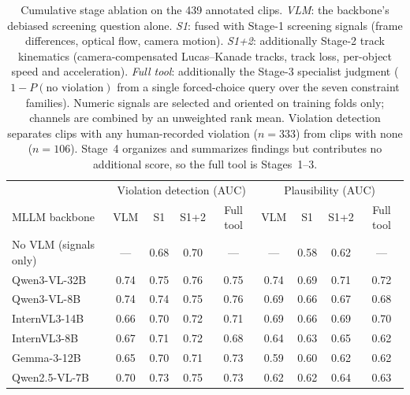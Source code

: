 \begin{table}[h]
    \centering
    \small
    \setlength{\tabcolsep}{5pt}
    \begin{tabular}{@{}lcccc|cccc@{}}
        \toprule
        & \multicolumn{4}{c|}{Violation detection (AUC)} & \multicolumn{4}{c}{Plausibility (AUC)} \\
        MLLM backbone & VLM & S1 & S1+2 & Full tool & VLM & S1 & S1+2 & Full tool \\
        \midrule
        No VLM (signals only) & --- & 0.68 & 0.70 & --- & --- & 0.58 & 0.62 & --- \\
        Qwen3-VL-32B & 0.74 & 0.75 & 0.76 & 0.75 & 0.74 & 0.69 & 0.71 & 0.72 \\
        Qwen3-VL-8B & 0.74 & 0.74 & 0.75 & 0.76 & 0.69 & 0.66 & 0.67 & 0.68 \\
        InternVL3-14B & 0.66 & 0.70 & 0.72 & 0.71 & 0.69 & 0.66 & 0.69 & 0.70 \\
        InternVL3-8B & 0.67 & 0.71 & 0.72 & 0.68 & 0.64 & 0.63 & 0.65 & 0.62 \\
        Gemma-3-12B & 0.65 & 0.70 & 0.71 & 0.73 & 0.59 & 0.60 & 0.62 & 0.62 \\
        Qwen2.5-VL-7B & 0.70 & 0.73 & 0.75 & 0.73 & 0.62 & 0.62 & 0.64 & 0.63 \\
        \bottomrule
    \end{tabular}
    \caption{Cumulative stage ablation on the 439 annotated clips. \emph{VLM}: the backbone's debiased screening question alone. \emph{S1}: fused with Stage-1 screening signals (frame differences, optical flow, camera motion). \emph{S1+2}: additionally Stage-2 track kinematics (camera-compensated Lucas--Kanade tracks, track loss, per-object speed and acceleration). \emph{Full tool}: additionally the Stage-3 specialist judgment ($1-P(\text{no violation})$ from a single forced-choice query over the seven constraint families). Numeric signals are selected and oriented on training folds only; channels are combined by an unweighted rank mean. Violation detection separates clips with any human-recorded violation ($n{=}333$) from clips with none ($n{=}106$). Stage~4 organizes and
      summarizes findings but contributes no additional score, so the full tool
      is Stages~1--3.}
    \label{tab:stage-ablation}
\end{table}

